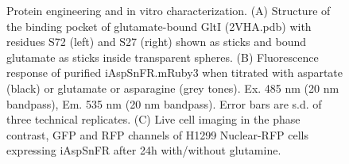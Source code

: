 \documentclass[9pt,lineno]{elife}
\begin{document}
\begin{figure}[ht!]
\centering
{}
\caption{
Protein engineering and in vitro characterization.
(A) Structure of the binding pocket of glutamate-bound GltI (2VHA.pdb) with residues S72 (left) and S27 (right) shown as sticks and bound glutamate as sticks inside transparent spheres.
(B) Fluorescence response of purified iAspSnFR.mRuby3 when titrated with aspartate (black) or glutamate or asparagine (grey tones). Ex. 485 nm (20 nm bandpass), Em. 535 nm (20 nm bandpass). Error bars are s.d. of three technical replicates.
(C) Live cell imaging in the phase contrast, GFP and RFP channels of H1299 Nuclear-RFP cells expressing iAspSnFR after 24h with/without glutamine.
}
\label{fig:Fig1}
\end{figure}
\end{document}

